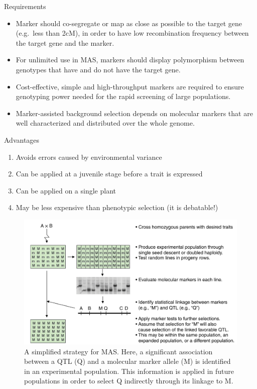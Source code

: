 \documentclass[
  ignorenonframetext,
  aspectratio=169]{beamer}
\providecommand{\tightlist}{%
  \setlength{\itemsep}{0pt}\setlength{\parskip}{0pt}}
\begin{document}
\begin{frame}{Requirements}
\protect\hypertarget{requirements}{}
\begin{itemize}
\tightlist
\item
  Marker should co-segregate or map as close as possible to the target
  gene (e.g.~less than 2cM), in order to have low recombination
  frequency between the target gene and the marker.
\end{itemize}

\begin{itemize}
\tightlist
\item
  For unlimited use in MAS, markers should display polymorphism between
  genotypes that have and do not have the target gene.
\item
  Cost-effective, simple and high-throughput markers are required to
  ensure genotyping power needed for the rapid screening of large
  populations.
\end{itemize}

\begin{itemize}
\tightlist
\item
  Marker-assisted background selection depends on molecular markers that
  are well characterized and distributed over the whole genome.
\end{itemize}
\end{frame}

\begin{frame}{Advantages}
\protect\hypertarget{advantages}{}
\begin{enumerate}
\tightlist
\item
  Avoids errors caused by environmental variance
\item
  Can be applied at a juvenile stage before a trait is expressed
\item
  Can be applied on a single plant
\item
  May be less expensive than phenotypic selection (it is debatable!)
\end{enumerate}

\begin{figure}
\includegraphics[width=0.38\linewidth]{../images/marker_assisted_selection} \caption{A simplified strategy for MAS. Here, a significant association between a QTL (Q) and a molecular marker allele (M) is identified in an experimental population. This information is applied in future populations in order to select Q indirectly through its linkage to M.}\label{fig:marker-assisted-selection}
\end{figure}
\end{frame}
\end{document}
